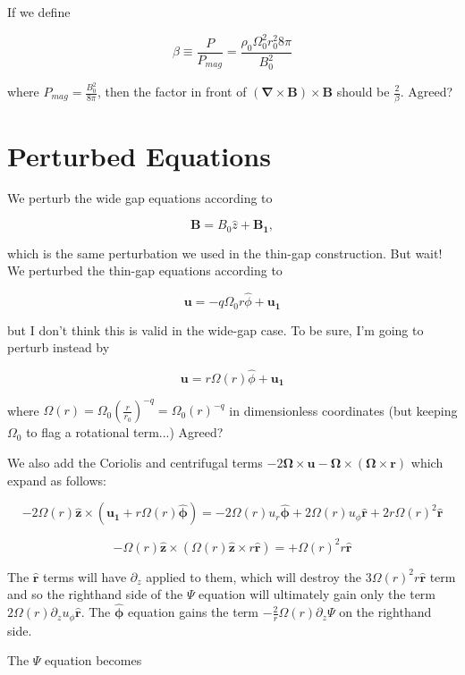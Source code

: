 \documentclass{paper}
\newcommand{\beq}{\begin{equation}}
\newcommand{\eeq}{\end{equation}}
\newcommand{\rhat}{\ensuremath{\mathbf{\hat{r}}}}
\newcommand{\phihat}{\ensuremath{\mathbf{\hat{\phi}}}}
\newcommand{\zhat}{\ensuremath{\mathbf{\hat{z}}}}
\begin{document}
If we define

\beq
\beta \equiv \frac{P}{P_{mag}} = \frac{\rho_0 \Omega_0^2 r_0^2 8 \pi}{B_0^2}
\eeq

where $P_{mag} = \frac{B_0^2}{8 \pi}$, then the factor in front of $(\mathbf{\nabla}\times\mathbf{B})\times\mathbf{B} $ should be $\frac{2}{\beta}$. Agreed?

\section{Perturbed Equations}

We perturb the wide gap equations according to 

\beq
\mathbf{B} = B_0 \hat{z} + \mathbf{B_1},
\eeq

which is the same perturbation we used in the thin-gap construction. But wait! We perturbed the thin-gap equations according to 

\beq
\mathbf{u} = -q \Omega_0 r \hat{\phi} + \mathbf{u_1}
\eeq

but I don't think this is valid in the wide-gap case. To be sure, I'm going to perturb instead by 

\beq
\mathbf{u} = r\Omega(r)\hat{\phi}+ \mathbf{u_1}
\eeq

where $\Omega(r) = \Omega_0 \left(\frac{r}{r_0}\right)^{-q} = \Omega_0 \left(r\right)^{-q}$ in dimensionless coordinates (but keeping $\Omega_0$ to flag a rotational term...) Agreed?

We also add the Coriolis and centrifugal terms $-2 \mathbf{\Omega} \times \mathbf{u} - \mathbf{\Omega} \times \left(\mathbf{\Omega} \times \mathbf{r}\right)$ which expand as follows:

\beq
-2\Omega(r)\zhat \times \left( \mathbf{u_1} + r\Omega(r)\phihat\right) = -2\Omega(r)u_{r}\phihat + 2\Omega(r)u_\phi\rhat + 2r\Omega(r)^2\rhat
\eeq

\beq
-\Omega(r)\zhat \times \left(\Omega(r)\zhat \times r\rhat\right) = +\Omega(r)^2 r \rhat
\eeq

The $\rhat$ terms will have $\partial_z$ applied to them, which will destroy the $3\Omega(r)^2 r \rhat$ term and so the righthand side of the $\Psi$ equation will ultimately gain only the term $2 \Omega(r) \partial_z u_\phi \rhat$. The $\phihat$ equation gains the term $-\frac{2}{r} \Omega(r) \partial_z \Psi$ on the righthand side. 

The $\Psi$ equation becomes
\end{document}

